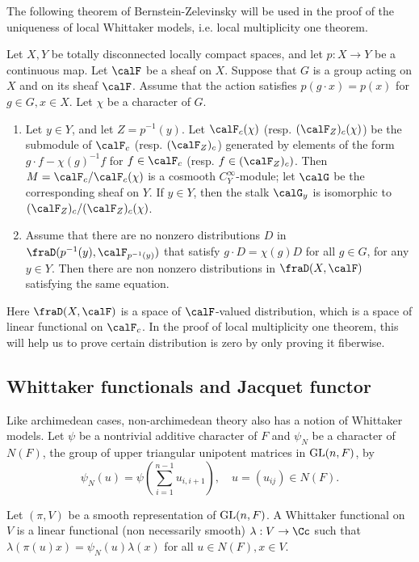 The following theorem of Bernstein-Zelevinsky will be used in the proof of the uniqueness of local Whittaker models, i.e. local multiplicity one theorem. 
\begin{proposition}
\label{bz}
Let $X, Y$ be totally disconnected locally compact spaces, and let $p:X\to Y$ be a continuous map. 
Let $\calF$ be a sheaf on $X$. 
Suppose that  $G$ is a group acting on $X$ and on its sheaf $\calF$. Assume that the action  satisfies $p(g\cdot x) = p(x)$ for $g\in G, x\in X$. 
Let $\chi$ be a character of $G$. 
\begin{enumerate}
\item Let $y\in Y$, and let $Z = p^{-1}(y)$. 
Let $\calF_{c}(\chi)$ (resp. $(\calF_{Z})_{c}(\chi)$) be the submodule of $\calF_{c}$ (resp. $(\calF_{Z})_{c}$) generated by elements of the form $g\cdot f - \chi(g)^{-1}f$ for $f\in \calF_{c}$ (resp. $f\in (\calF_{Z})_{c})$. 
Then $M =\calF_{c}/ \calF_{c}(\chi)$ is a cosmooth $C_{Y}^{\infty}$-module; let $\calG$ be the corresponding sheaf on $Y$. If $y\in Y$, then the stalk $\calG_{y}$ is isomorphic to $(\calF_{Z})_{c} / (\calF_{Z})_{c}(\chi)$. 
\item Assume that there are no nonzero distributions $D$ in $\fraD(p^{-1}(y), \calF_{p^{-1}(y)})$ that satisfy $g\cdot D = \chi(g)D$ for all $g\in G$, for any $y\in Y$. 
Then there are non nonzero distributions in $\fraD(X, \calF)$ satisfying the same equation. 
\end{enumerate}
\end{proposition}
Here $\fraD(X, \calF)$ is a space of $\calF$-valued distribution, which is a space of linear functional on $\calF_{c}$. In the proof of local multiplicity one theorem, this will help us to prove certain distribution is zero by only proving it fiberwise. 



\subsection{Whittaker functionals and Jacquet functor}
Like archimedean cases, non-archimedean theory also has a notion of Whittaker models. 
Let $\psi$ be a nontrivial additive character of $F$ and $\psi_{N}$ be a character of $N(F)$, the group of upper triangular unipotent matrices in $\mathrm{GL}(n, F)$, by
$$
\psi_{N}(u) = \psi\left( \sum_{i=1}^{n-1} u_{i, i+1}\right), \quad u = (u_{ij})\in N(F). 
$$

\begin{definition}
Let $(\pi, V)$ be a smooth representation of $\mathrm{GL}(n, F)$. 
A Whittaker functional on $V$ is a linear functional (non necessarily smooth) $\lambda: V\to \Cc$ such that $\lambda(\pi(u)x) = \psi_{N}(u)\lambda(x)$ for all $u\in N(F), x\in V$.
\end{definition}


